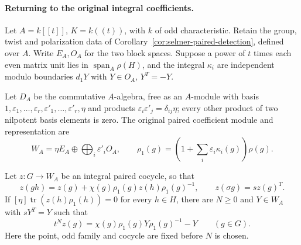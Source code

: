 \paragraph{Returning to the original integral coefficients.}
Let $A=k[[t]]$, $K=k((t))$, with $k$ of odd characteristic.
Retain the group, twist and polarization data of
Corollary~\ref{cor:selmer-paired-detection}, defined over $A$.
Write $E_A,O_A$ for the two block spaces. Suppose a power of $t$
times each even matrix unit lies in $\operatorname{span}_A\rho(H)$,
and the integral $\kappa_i$ are independent modulo boundaries
$d_1Y$ with $Y\in O_A$, $Y^T=-Y$.

Let $D_A$ be the commutative $A$-algebra, free as an $A$-module with basis
$1,\varepsilon_1,\ldots,\varepsilon_r,
\varepsilon'_1,\ldots,\varepsilon'_r,\eta$ and products
$\varepsilon_i\varepsilon'_j=\delta_{ij}\eta$;
every other product of two nilpotent basis elements is zero.
The original paired coefficient module and representation are
\[
 W_A=\eta E_A\oplus\bigoplus_i\varepsilon'_iO_A,
 \qquad
 \rho_1(g)=\left(1+\sum_i\varepsilon_i\kappa_i(g)\right)\rho(g).
\]

\begin{proposition}
\label{prop:selmer-integral-paired-detection}
Let $z:G\to W_A$ be an integral paired cocycle, so that
\[
 z(gh)=z(g)+\chi(g)\rho_1(g)z(h)\rho_1(g)^{-1},
 \qquad z(\sigma g)=s z(g)^T.
\]
If $[\eta]\operatorname{tr}(z(h)\rho_1(h))=0$ for every $h\in H$,
there are $N\geq0$ and $Y\in W_A$ with $sY^T=Y$ such that
\[
          t^Nz(g)=\chi(g)\rho_1(g)Y\rho_1(g)^{-1}-Y
                           \qquad(g\in G).
\]
Here the point, odd family and cocycle are fixed before $N$ is chosen.
\end{proposition}

